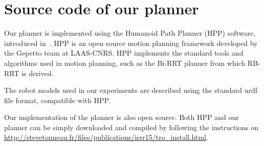 \section{Source code of our planner}
\label{app:hpp}
Our planner is implemented using the Humanoid Path Planner (HPP) software, introduced in~\cite{7759083}.
HPP is an open source motion planning framework developed by the Gepetto team at LAAS-CNRS.
HPP implements the standard tools and algorithms used in motion planning,
such as the Bi-RRT planner from which RB-RRT is derived.

The robot models used in our experiments are described using the standard urdf file format, compatible with HPP.

Our implementation of the planner is also open source.
Both HPP and our planner can be simply downloaded and compiled by following the instructions on
\url{http://stevetonneau.fr/files/publications/isrr15/tro_install.html}. 
